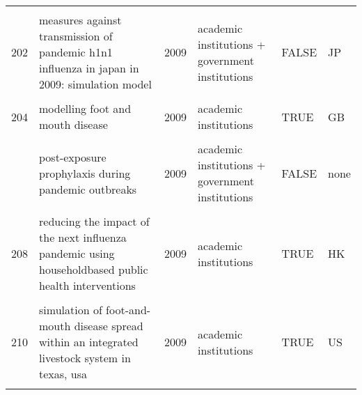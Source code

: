 \documentclass[
]{article}
\begin{document}
\begin{landscape}
\begin{longtable}{l>{\raggedright\arraybackslash}p{4cm}l>{\raggedright\arraybackslash}p{3.5cm}l>{\raggedright\arraybackslash}p{1.5cm}}
\cellcolor{gray!6}{201} & \cellcolor{gray!6}{household epidemics: modelling effects of early stage vaccination} & \cellcolor{gray!6}{2009} & \cellcolor{gray!6}{academic institutions} & \cellcolor{gray!6}{TRUE} & \cellcolor{gray!6}{SE TZ}\\
202 & measures against transmission of pandemic h1n1 influenza in japan in 2009: simulation model & 2009 & academic institutions + government institutions & FALSE & JP\\
\cellcolor{gray!6}{203} & \cellcolor{gray!6}{modeling vaccination campaigns and the fall/winter 2009 activity of the new a(h1n1) influenza in the northern hemisphere} & \cellcolor{gray!6}{2009} & \cellcolor{gray!6}{academic institutions + NGO} & \cellcolor{gray!6}{FALSE} & \cellcolor{gray!6}{northern hemisphere}\\
204 & modelling foot and mouth disease & 2009 & academic institutions & TRUE & GB\\
\cellcolor{gray!6}{205} & \cellcolor{gray!6}{modelling of the influenza a(h1n1)v outbreak in mexico city, april-may 2009, with control sanitary measures} & \cellcolor{gray!6}{2009} & \cellcolor{gray!6}{academic institutions + government institutions} & \cellcolor{gray!6}{FALSE} & \cellcolor{gray!6}{MX}\\
\addlinespace
206 & post-exposure prophylaxis during pandemic outbreaks & 2009 & academic institutions + government institutions & FALSE & none\\
\cellcolor{gray!6}{207} & \cellcolor{gray!6}{potential for a global dynamic of influenza a (h1n1)} & \cellcolor{gray!6}{2009} & \cellcolor{gray!6}{academic institutions + government institutions} & \cellcolor{gray!6}{FALSE} & \cellcolor{gray!6}{global}\\
208 & reducing the impact of the next influenza pandemic using householdbased public health interventions & 2009 & academic institutions & TRUE & HK\\
\cellcolor{gray!6}{209} & \cellcolor{gray!6}{seasonal transmission potential and activity peaks of the new influenza a(h1n1): a monte carlo likelihood analysis based on human mobility} & \cellcolor{gray!6}{2009} & \cellcolor{gray!6}{academic institutions} & \cellcolor{gray!6}{TRUE} & \cellcolor{gray!6}{global}\\
210 & simulation of foot-and-mouth disease spread within an integrated livestock system in texas, usa & 2009 & academic institutions & TRUE & US\\
\addlinespace
\cellcolor{gray!6}{211} & \cellcolor{gray!6}{the transmissibility and control of pandemic influenza a (h1n1) virus} & \cellcolor{gray!6}{2009} & \cellcolor{gray!6}{academic institutions + government institutions} & \cellcolor{gray!6}{FALSE} & \cellcolor{gray!6}{US}\\

\end{longtable}
\end{landscape}
\end{document}
